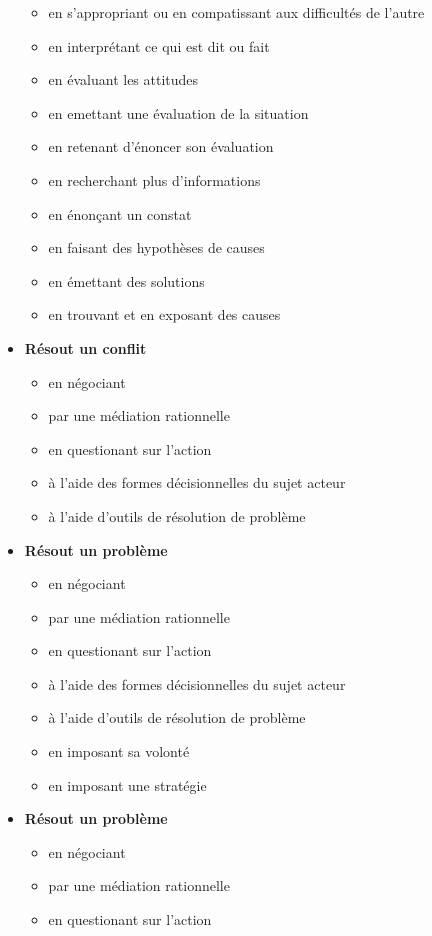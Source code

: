 \documentclass[8pt,a4paper]{article}
\begin{document}
\begin{itemize}
\begin{itemize}
\item en s'appropriant ou en compatissant aux difficultés de l'autre   
\item en interprétant ce qui est dit ou fait
\item en évaluant les attitudes  
\item en emettant une évaluation de la situation  
\item en retenant d'énoncer son évaluation  
\item en recherchant plus d'informations  
\item en énonçant un constat
\item en faisant des hypothèses de causes
\item en émettant des solutions
\item en trouvant et en exposant des causes  
\\ 
 \end{itemize}
\item \textbf{Résout un conflit}
\begin{itemize}
\item en négociant
\item par une médiation rationnelle
\item en questionant sur l'action
\item à l'aide des formes décisionnelles du sujet acteur
\item à l'aide d'outils de résolution de problème
\\ 
 \end{itemize}
\item \textbf{Résout un problème}
\begin{itemize}
\item en négociant
\item par une médiation rationnelle
\item en questionant sur l'action
\item à l'aide des formes décisionnelles du sujet acteur
\item à l'aide d'outils de résolution de problème
\item en imposant sa volonté
\item en imposant une stratégie
\\ 
 \end{itemize}
\item \textbf{Résout un problème}
\begin{itemize}
\item en négociant
\item par une médiation rationnelle
\item en questionant sur l'action

\end{itemize}
\end{itemize}
\end{document}
